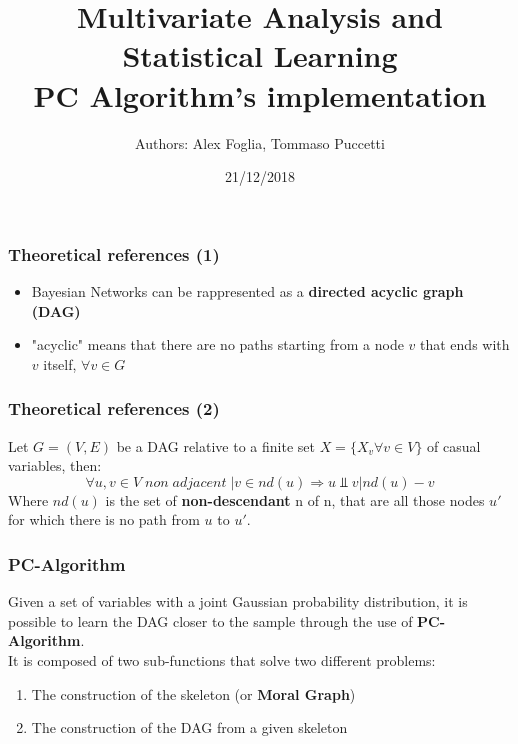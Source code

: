 \documentclass[xcolor ={table,usenames,dvipsnames}]{beamer}
\title{Multivariate Analysis and Statistical Learning \\PC Algorithm's implementation}
\author{Authors: Alex Foglia, Tommaso Puccetti}
\institute{Universit\`a  degli Studi di Firenze}
\date{21/12/2018}
\theoremstyle{definition}
\begin{document}
	
	\begin{frame}
		\maketitle
	\end{frame}

	\begin{frame}
		\frametitle{Theoretical references (1)}
		\begin{itemize}
			\item Bayesian Networks can be rappresented as a \textbf{directed acyclic graph (DAG)}
			\item "acyclic" means that there are no paths starting from a node $v$ that ends with $v$ itself, $\forall v \in G$
			
		\end{itemize}
	\end{frame}

	\begin{frame}
		\frametitle{Theoretical references (2)}
		Let $G = (V,E)$ be a DAG relative to a finite set  $X = \{X_v \forall v \in V\}$ of casual variables, then:
		$$
		\forall u,v \in V \;non\;adjacent\;| v \in nd(u) \Rightarrow u \Perp v | nd(u) - v
		$$
	Where $nd(u)$ is the set of \textbf{non-descendant} n of n, that are all those nodes $u'$ for which there is no path from $u$ to $u'$. \\
	\end{frame}

	\begin{frame}
		\frametitle{PC-Algorithm}
		Given a set of variables with a joint Gaussian probability distribution, it is possible to learn the DAG closer to the sample through the use of  \textbf{PC-Algorithm}. \\
		It is composed of two sub-functions that solve two different problems:
		\begin{enumerate}
			\item The construction of the skeleton (or \textbf{Moral Graph})
			\item The construction of the DAG from a given skeleton
		\end{enumerate}
	\end{frame}
\end{document}
